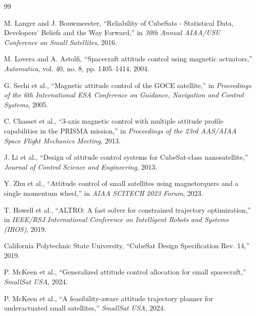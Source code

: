 \documentclass[9pt]{extarticle}
\begin{document}


\begin{thebibliography}{99}

M. Langer and J. Bouwmeester, ``Reliability of CubeSats - Statistical Data, Developers' Beliefs and the Way Forward,'' in \textit{30th Annual AIAA/USU Conference on Small Satellites}, 2016.

M. Lovera and A. Astolfi, ``Spacecraft attitude control using magnetic actuators,'' \textit{Automatica}, vol. 40, no. 8, pp. 1405--1414, 2004.

G. Sechi et al., ``Magnetic attitude control of the GOCE satellite,'' in \textit{Proceedings of the 6th International ESA Conference on Guidance, Navigation and Control Systems}, 2005.

C. Chasset et al., ``3-axis magnetic control with multiple attitude profile capabilities in the PRISMA mission,'' in \textit{Proceedings of the 23rd AAS/AIAA Space Flight Mechanics Meeting}, 2013.

J. Li et al., ``Design of attitude control systems for CubeSat-class nanosatellite,'' \textit{Journal of Control Science and Engineering}, 2013.

Y. Zhu et al., ``Attitude control of small satellites using magnetorquers and a single momentum wheel,'' in \textit{AIAA SCITECH 2023 Forum}, 2023.

T. Howell et al., ``ALTRO: A fast solver for constrained trajectory optimization,'' in \textit{IEEE/RSJ International Conference on Intelligent Robots and Systems (IROS)}, 2019.

California Polytechnic State University, ``CubeSat Design Specification Rev. 14,'' 2019.

P. McKeen et al., ``Generalized attitude control allocation for small spacecraft,'' \textit{SmallSat USA}, 2024.

P. McKeen et al., ``A feasibility-aware attitude trajectory planner for underactuated small satellites,'' \textit{SmallSat USA}, 2024.

\end{thebibliography}
\end{document}
